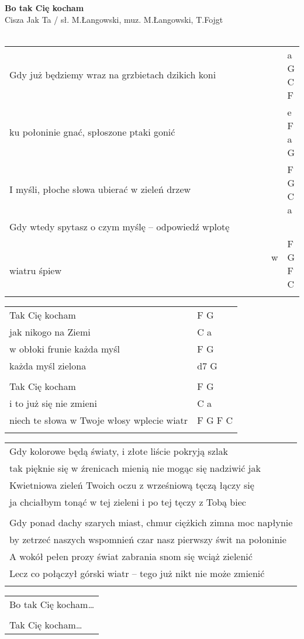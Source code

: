 \documentclass[a5paper]{article}
\begin{document}


\noindent
\fontsize{12pt}{15pt}\selectfont
\textbf{Bo tak Cię kocham} \\
\fontsize{8pt}{10pt}\selectfont
Cisza Jak Ta / sł. M.Łangowski, muz. M.Łangowski, T.Fojgt \\ \\
\fontsize{10pt}{12pt}\selectfont
{}
\begin{tabular}{@{}p{9cm}p{2cm}@{}}
\noindent
Gdy już będziemy wraz na grzbietach dzikich koni & a G C F \\
ku połoninie gnać, spłoszone ptaki gonić & e F a G \\
I myśli, płoche słowa ubierać w zieleń drzew & F G C a \\
Gdy wtedy spytasz o czym myślę – odpowiedź wplotę & \\
~~~~~~~~~~~~~~~~~~~~~~~~~~~~~~~~~~~~~~~~~~~~~~~~~~~~~~~~w wiatru śpiew & F G F C \\ \\
\end{tabular}

\noindent
\begin{tabular}{@{}p{8cm}p{2cm}@{}}
Tak Cię kocham & F G \\
jak nikogo na Ziemi & C a \\
w obłoki frunie każda myśl & F G \\
każda myśl zielona & d7 G \\ \\

Tak Cię kocham & F G \\
i to już się nie zmieni & C a \\
niech te słowa w Twoje włosy wplecie wiatr & F G F C \\ \\
\end{tabular}

\noindent
\begin{tabular}{@{}p{10.5cm}@{}}
Gdy kolorowe będą światy, i złote liście pokryją szlak \\
tak pięknie się w źrenicach mienią nie mogąc się nadziwić jak \\
Kwietniowa zieleń Twoich oczu z wrześniową tęczą łączy się \\
ja chciałbym tonąć w tej zieleni i po tej tęczy z Tobą biec \\ \\

Gdy ponad dachy szarych miast, chmur ciężkich zimna moc napłynie \\
by zetrzeć naszych wspomnień czar nasz pierwszy świt na połoninie \\
A wokół pełen prozy świat zabrania snom się wciąż zielenić \\
Lecz co połączył górski wiatr – tego już nikt nie może zmienić \\ \\
\end{tabular}

\noindent
\begin{tabular}{@{}p{8.5cm}@{}}
Bo tak Cię kocham… \\ \\
Tak Cię kocham…
\end{tabular}
\end{document}
